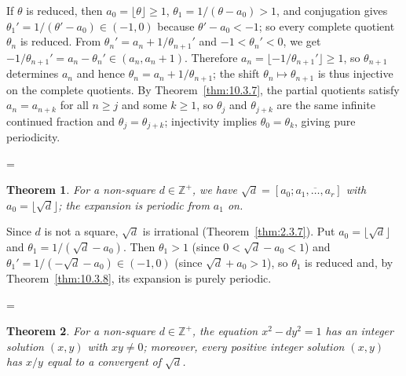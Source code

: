 \documentclass[11pt]{article}
\makeatletter
\theoremstyle{ntstyle}
\newtheorem{theorem}{Theorem}[subsection]
\let\nt@closedisplay\]
\def\nt@guardedclose{\@ifnextchar\par{\nt@closeafterpar}{\@ifnextchar\end{\postdisplaypenalty\@M\nt@closedisplay}{\nt@closedisplay}}}
\def\nt@closeafterpar\par{\@ifnextchar\par{\nt@closeafterpar}{\@ifnextchar\end{\postdisplaypenalty\@M\nt@closedisplay\par}{\nt@closedisplay\par}}}
\renewenvironment{proof}[1][\proofname]{\par
  \pushQED{\qed}\normalfont\topsep\medskipamount\edef\nt@afterproof{\@endparpenalty=\the\@endparpenalty\relax}\@beginparpenalty\@M\@endparpenalty\@M\let\]\nt@guardedclose\trivlist\item[]\textit{#1\@addpunct{.}} \ignorespaces}{\ifvmode\addpenalty\@M\fi\popQED\nt@afterproof\endtrivlist\@endpefalse}
\makeatother
\begin{document}
\begin{proof} If $\theta$ is reduced, then
	$a_0=\lfloor\theta\rfloor\ge1$, $\theta_1=1/(\theta-a_0)>1$, and
	conjugation gives $\theta_1'=1/(\theta'-a_0)\in(-1,0)$ because
	$\theta'-a_0<-1$; so every complete quotient $\theta_n$ is reduced.
	From $\theta_n'=a_n+1/\theta_{n+1}'$ and $-1<\theta_n'<0$,
	we get $-1/\theta_{n+1}'=a_n-\theta_n'\in(a_n,a_n+1)$.
	Therefore $a_n=\lfloor-1/\theta_{n+1}'\rfloor\ge1$, so
	$\theta_{n+1}$ determines $a_n$ and hence
	$\theta_n=a_n+1/\theta_{n+1}$; the shift
	$\theta_n\mapsto\theta_{n+1}$ is thus injective on the complete
	quotients. By Theorem~\ref{thm:10.3.7}, the partial quotients satisfy
	$a_n=a_{n+k}$ for all $n\ge j$ and some $k\ge1$, so $\theta_j$ and
	$\theta_{j+k}$ are the same infinite continued fraction and
	$\theta_j=\theta_{j+k}$;
	injectivity implies $\theta_0=\theta_k$, giving pure
	periodicity.

\end{proof}
\begin{theorem}\label{thm:10.3.9} For a
	non-square $d\in\mathbb{Z}^+$, we have $\sqrt
		{d}=[a_0;\overline{a_1,\ldots,a_r}]$ with $a_0=\lfloor\sqrt{d}\rfloor$;
	the expansion is periodic from $a_1$ on.

\end{theorem}

\begin{proof} Since $d$ is not a square, $\sqrt{d}$ is irrational
	(Theorem~\ref{thm:2.3.7}). Put $a_0=\lfloor\sqrt{d}\rfloor$ and
	$\theta_1=1/(\sqrt{d}-a_0)$. Then $\theta_1>1$ (since $0<\sqrt
		{d}-a_0<1$) and $\theta_1'=1/(-\sqrt{d}-a_0)\in(-1,0)$ (since $\sqrt
		{d}+a_0>1$), so $\theta_1$ is reduced and, by Theorem~\ref{thm:10.3.8}, its expansion is purely
	periodic.

\end{proof}
\begin{theorem}\label{thm:10.3.10}
	For a non-square $d\in\mathbb{Z}^+$, the equation $x^2-dy^2=1$ has an integer solution
	$(x,y)$ with $xy\neq0$; moreover, every positive integer solution $(x,y)$ has $x/y$ equal
	to a convergent of $\sqrt{d}$.

\end{theorem}
\end{document}
